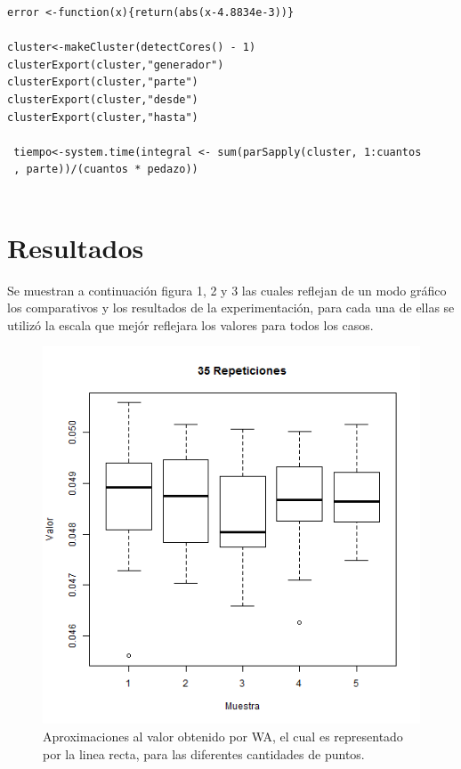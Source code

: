 \documentclass[a4paper]{article}
\begin{document}
\begin{lstlisting}[frame=single]
error <-function(x){return(abs(x-4.8834e-3))}

cluster<-makeCluster(detectCores() - 1)
clusterExport(cluster,"generador")
clusterExport(cluster,"parte")
clusterExport(cluster,"desde")
clusterExport(cluster,"hasta")

 tiempo<-system.time(integral <- sum(parSapply(cluster, 1:cuantos
 , parte))/(cuantos * pedazo))
 
\end{lstlisting}


\section{Resultados}
Se muestran a continuación figura 1, 2 y 3 las cuales reflejan de un modo gráfico los comparativos y los resultados de la experimentación, para cada una de ellas se utilizó la escala que mejór reflejara los valores para todos los casos.


\begin{figure}[!]
\centering
\includegraphics[width=0.7\linewidth]{aprox}
\caption{Aproximaciones al valor obtenido por WA, el cual es representado por la linea recta, para las diferentes cantidades de puntos.}
\label{fig:aprox}
\end{figure}
\end{document}
